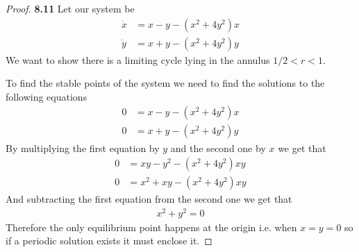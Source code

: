 \documentclass[11pt]{article}
\theoremstyle{definition}
\begin{document}
\cleardoublepage
    \begin{proof}{\textbf{8.11}}
        Let our system be
        \begin{align*}
            \dot{x} &= x - y - (x^2 + 4y^2)x\\
            \dot{y} &= x + y - (x^2 + 4y^2)y
        \end{align*}
        We want to show there is a limiting cycle lying in the annulus
        $1/2 < r < 1$.
        
        To find the stable points of the system we need to find the solutions to
        the following equations
        \begin{align*}
            0 &= x - y - (x^2 + 4y^2)x\\
            0 &= x + y - (x^2 + 4y^2)y
        \end{align*}
        By multiplying the first equation by $y$ and the second one by $x$ we
        get that
        \begin{align*}
            0 &= xy - y^2 - (x^2 + 4y^2)xy\\
            0 &= x^2 + xy - (x^2 + 4y^2)xy
        \end{align*}
        And subtracting the first equation from the second one we get that
        \begin{align*}
            x^2+y^2 = 0
        \end{align*}
        Therefore the only equilibrium point happens at the origin i.e. when
        $x=y=0$ so if a periodic solution exists it must enclose it.


\end{proof}
\end{document}
